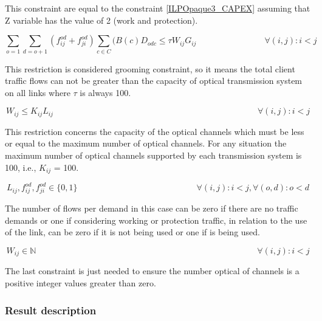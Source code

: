 This constraint are equal to the constraint \ref{ILPOpaque3_CAPEX} assuming that Z variable has the value of 2 (work and protection).

\begin{equation}
\sum_{o=1} \sum_{d=o+1} \left(f_{ij}^{od} + f_{ji}^{od}\right) \sum_{c\in C} (B\left(c\right) D_{odc}\leq \tau W_{ij} G_{ij} \qquad \qquad \qquad \qquad
\forall(i,j) : i < j
\label{ILPOpaque4}
\end{equation}

This restriction is considered grooming constraint, so it means the total client traffic flows can not be greater than the capacity of optical transmission system on all links where $\tau$ is always 100.

\begin{equation}
W_{ij} \leq K_{ij} L_{ij} \qquad \qquad \qquad \qquad \qquad \qquad \qquad \qquad \qquad \qquad \qquad \qquad \forall(i,j) : i < j
\label{ILPOpaque5}
\end{equation}

This restriction concerns the capacity of the optical channels which must be less or equal to the maximum number of optical channels. For any situation the maximum number of optical channels supported by each transmission system is 100, i.e., $K_{ij}$ = 100.

\begin{equation}
L_{ij} , f_{ij}^{od} , f_{ji}^{od} \in \{0,1\} \qquad \qquad \qquad \qquad \qquad \qquad \qquad
\forall(i,j) : i < j, \forall(o,d) : o < d
\label{ILPOpaque6}
\end{equation}

The number of flows per demand in this case can be zero if there are no traffic demands or one if considering working or protection traffic, in relation to the use of the link, can be zero if it is not being used or one if is being used.

\begin{equation}
W_{ij} \in \mathbb{N}  \qquad \qquad \qquad \qquad \qquad \qquad \qquad \qquad \qquad \qquad \qquad \qquad \qquad
\forall(i,j) : i < j\label{ILPOpaque7}
\end{equation}

The last constraint is just needed to ensure the number optical of channels is a positive integer values greater than zero.\\


\subsubsection{Result description}

